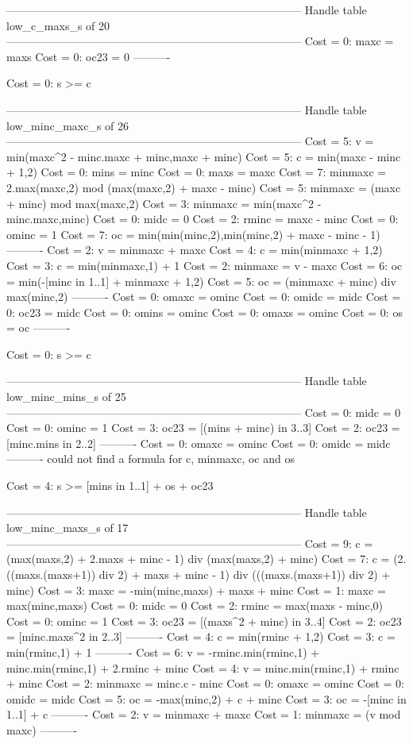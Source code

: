 --------------------------------------------------------------------------------
Handle table low_c_maxs_s of 20
--------------------------------------------------------------------------------
Cost =  0:  maxc = maxs
Cost =  0:  oc23 = 0
----------

Cost =  0:  s >= c

--------------------------------------------------------------------------------
Handle table low_minc_maxc_s of 26
--------------------------------------------------------------------------------
Cost =  5:  v       = min(maxc^2 - minc.maxc + minc,maxc + minc)
Cost =  5:  c       = min(maxc - minc + 1,2)
Cost =  0:  mins    = minc
Cost =  0:  maxs    = maxc
Cost =  7:  minmaxc = 2.max(maxc,2) mod (max(maxc,2) + maxc - minc)
Cost =  5:  minmaxc = (maxc + minc) mod max(maxc,2)
Cost =  3:  minmaxc = min(maxc^2 - minc.maxc,minc)
Cost =  0:  midc    = 0
Cost =  2:  rminc   = maxc - minc
Cost =  0:  ominc   = 1
Cost =  7:  oc      = min(min(minc,2),min(minc,2) + maxc - minc - 1)
----------
Cost =  2:  v       = minmaxc + maxc
Cost =  4:  c       = min(minmaxc + 1,2)
Cost =  3:  c       = min(minmaxc,1) + 1
Cost =  2:  minmaxc = v - maxc
Cost =  6:  oc      = min(-[minc in 1..1] + minmaxc + 1,2)
Cost =  5:  oc      = (minmaxc + minc) div max(minc,2)
----------
Cost =  0:  omaxc   = ominc
Cost =  0:  omidc   = midc
Cost =  0:  oc23    = midc
Cost =  0:  omins   = ominc
Cost =  0:  omaxs   = ominc
Cost =  0:  os      = oc
----------

Cost =  0:  s >= c

--------------------------------------------------------------------------------
Handle table low_minc_mins_s of 25
--------------------------------------------------------------------------------
Cost =  0:  midc    = 0
Cost =  0:  ominc   = 1
Cost =  3:  oc23    = [(mins + minc) in 3..3]
Cost =  2:  oc23    = [minc.mins in 2..2]
----------
Cost =  0:  omaxc   = ominc
Cost =  0:  omidc   = midc
----------
could not find a formula for c, minmaxc, oc and os

Cost =  4:  s >= [mins in 1..1] + os + oc23

--------------------------------------------------------------------------------
Handle table low_minc_maxs_s of 17
--------------------------------------------------------------------------------
Cost =  9:  c       = (max(maxs,2) + 2.maxs + minc - 1) div (max(maxs,2) + minc)
Cost =  7:  c       = (2.((maxs.(maxs+1)) div 2) + maxs + minc - 1) div (((maxs.(maxs+1)) div 2) + minc)
Cost =  3:  maxc    = -min(minc,maxs) + maxs + minc
Cost =  1:  maxc    = max(minc,maxs)
Cost =  0:  midc    = 0
Cost =  2:  rminc   = max(maxs - minc,0)
Cost =  0:  ominc   = 1
Cost =  3:  oc23    = [(maxs^2 + minc) in 3..4]
Cost =  2:  oc23    = [minc.maxs^2 in 2..3]
----------
Cost =  4:  c       = min(rminc + 1,2)
Cost =  3:  c       = min(rminc,1) + 1
----------
Cost =  6:  v       = -rminc.min(rminc,1) + minc.min(rminc,1) + 2.rminc + minc
Cost =  4:  v       = minc.min(rminc,1) + rminc + minc
Cost =  2:  minmaxc = minc.c - minc
Cost =  0:  omaxc   = ominc
Cost =  0:  omidc   = midc
Cost =  5:  oc      = -max(minc,2) + c + minc
Cost =  3:  oc      = -[minc in 1..1] + c
----------
Cost =  2:  v       = minmaxc + maxc
Cost =  1:  minmaxc = (v mod maxc)
----------


